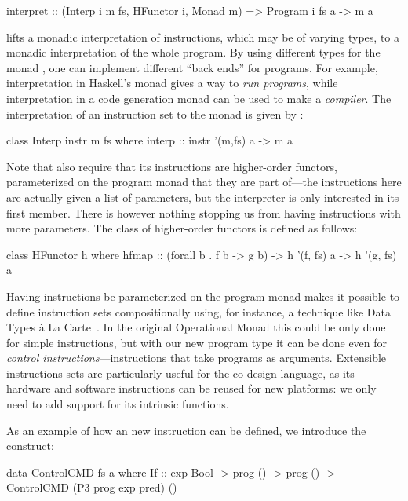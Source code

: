 \documentclass[../paper.tex]{subfiles}
\begin{document}
\begin{code}
interpret :: (Interp i m fs, HFunctor i, Monad m) => Program i fs a -> m a
\end{code}

 lifts a monadic interpretation of instructions, which may be of varying types, to a monadic interpretation of the whole program. By using different types for the monad , one can implement different ``back ends'' for programs. For example, interpretation in Haskell's  monad gives a way to \emph{run programs}, while interpretation in a code generation monad can be used to make a \emph{compiler}. The interpretation of an instruction set  to the monad  is given by :

\begin{code}
class Interp instr m fs where
  interp :: instr '(m,fs) a -> m a
\end{code}

Note that  also require that its instructions are higher-order functors, parameterized on the program monad that they are part of---the instructions here are actually given a list of parameters, but the interpreter is only interested in its first member. There is however nothing stopping us from having instructions with more parameters. The  class of higher-order functors is defined as follows:

\begin{code}
class HFunctor h where
  hfmap :: (forall b . f b -> g b) -> h '(f, fs) a -> h '(g, fs) a
\end{code}

Having instructions be parameterized on the program monad makes it possible to define instruction sets compositionally using, for instance, a technique like Data Types \`{a} La Carte~\cite{DTC}. In the original Operational Monad this could be only done for simple instructions, but with our new program type it can be done even for \emph{control instructions}---instructions that take programs as arguments. Extensible instructions sets are particularly useful for the co-design language, as its hardware and software instructions can be reused for new platforms: we only need to add support for its intrinsic functions.

As an example of how an new instruction can be defined, we introduce the  construct:

\begin{code}
data ControlCMD fs a where
  If :: exp Bool -> prog () -> prog () -> ControlCMD (P3 prog exp pred) ()
\end{code}
\end{document}
